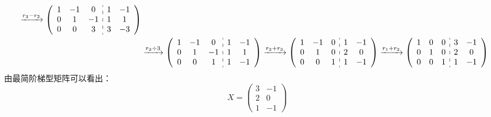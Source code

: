 \documentclass[a4paper]{report}
\begin{document}
\begin{jie}
\begin{align*}
{}\xrightarrow{\substack{r_3-r_2}}
{
\left(
 \begin{array}{c:c}
\begin{matrix}
1&-1&0\\
0&1&-1\\
0&0&3
\end{matrix}&
\begin{matrix}
1&-1\\
1&1\\
3&-3
\end{matrix}
\end{array}
\right)
}\\ &\xrightarrow{\substack{r_3\div 3}}
{
\left(
 \begin{array}{c:c}
\begin{matrix}
1&-1&0\\
0&1&-1\\
0&0&1
\end{matrix}&
\begin{matrix}
1&-1\\
1&1\\
1&-1
\end{matrix}
\end{array}
\right)
}\xrightarrow{\substack{r_2+r_3}}
{
\left(
 \begin{array}{c:c}
\begin{matrix}
1&-1&0\\
0&1&0\\
0&0&1
\end{matrix}&
\begin{matrix}
1&-1\\
2&0\\
1&-1
\end{matrix}
\end{array}
\right)
}\xrightarrow{\substack{r_1+r_2}}
{
\left(
 \begin{array}{c:c}
\begin{matrix}
1&0&0\\
0&1&0\\
0&0&1
\end{matrix}&
\begin{matrix}
3&-1\\
2&0\\
1&-1
\end{matrix}
\end{array}
\right)
}
\end{align*}
由最简阶梯型矩阵可以看出：
\begin{equation*}
 X=
 \begin{pmatrix}
3&-1\\
2&0\\
1&-1
 \end{pmatrix}
\end{equation*}
\end{jie}
\end{document}
